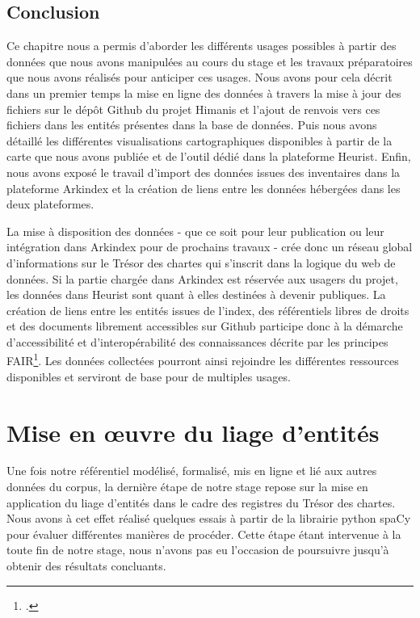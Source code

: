 \documentclass[a4paper,12pt,twoside]{book}
\begin{document}
	\section*{Conclusion}
	
	Ce chapitre nous a permis d'aborder les différents usages possibles à partir des données que nous avons manipulées au cours du stage et les travaux préparatoires que nous avons réalisés pour anticiper ces usages. Nous avons pour cela décrit dans un premier temps la mise en ligne des données à travers la mise à jour des fichiers sur le dépôt Github du projet Himanis et l'ajout de renvois vers ces fichiers dans les entités présentes dans la base de données. Puis nous avons détaillé les différentes visualisations cartographiques disponibles à partir de la carte que nous avons publiée et de l'outil dédié dans la plateforme Heurist. Enfin, nous avons exposé le travail d'import des données issues des inventaires dans la plateforme Arkindex et la création de liens entre les données hébergées dans les deux plateformes.
	
	La mise à disposition des données - que ce soit pour leur publication ou leur intégration dans Arkindex pour de prochains travaux - crée donc un réseau global d'informations sur le Trésor des chartes qui s'inscrit dans la logique du web de données. Si la partie chargée dans Arkindex est réservée aux usagers du projet, les données dans Heurist sont quant à elles destinées à devenir publiques. La création de liens entre les entités issues de l'index, des référentiels libres de droits et des documents librement accessibles sur Github participe donc à la démarche d'accessibilité et d'interopérabilité des connaissances décrite par les principes FAIR\footcite{ccsd_principes_nodate}. Les données collectées pourront ainsi rejoindre les différentes ressources disponibles et serviront de base pour de multiples usages.
	
	\chapter{Mise en œuvre du liage d'entités}
	
	Une fois notre référentiel modélisé, formalisé, mis en ligne et lié aux autres données du corpus, la dernière étape de notre stage repose sur la mise en application du liage d'entités dans le cadre des registres du Trésor des chartes. Nous avons à cet effet réalisé quelques essais à partir de la librairie python spaCy pour évaluer différentes manières de procéder. Cette étape étant intervenue à la toute fin de notre stage, nous n'avons pas eu l'occasion de poursuivre jusqu'à obtenir des résultats concluants.
	
\end{document}
